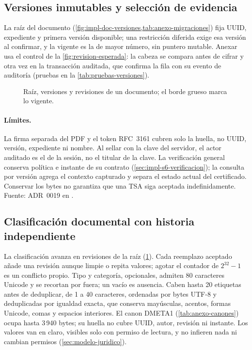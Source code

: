 \subsection{Versiones inmutables y selección de evidencia}\label{sec:impl-http-versiones}

La raíz del documento (\cref{fig:impl-doc-versiones,tab:anexo-migraciones}) fija UUID, expediente y primera versión disponible; una restricción diferida exige esa versión al confirmar, y la vigente es la de mayor número, sin puntero mutable. Anexar usa el control de la \cref{fig:revision-esperada}: la cabeza se compara antes de cifrar y otra vez en la transacción auditada, que confirma la fila con su evento de auditoría (pruebas en la \cref{tab:pruebas-versiones}).

\begin{figure}[!htbp]
  \centering
  
  \caption{Raíz, versiones y revisiones de un documento; el borde grueso marca lo vigente.}
  \label{fig:impl-doc-versiones}
\end{figure}

\paragraph{Límites.} La firma separada del PDF y el token RFC~3161 cubren solo la huella, no UUID, versión, expediente ni nombre. Al sellar con la clave del servidor, el actor auditado es el de la sesión, no el titular de la clave. La verificación general conserva política e instante de su contrato (\cref{sec:impl-s6-verificacion}); la consulta por versión agrega el contexto capturado y separa el estado actual del certificado. Conservar los bytes no garantiza que una TSA siga aceptada indefinidamente. Fuente: ADR~0019 en .

\subsection{Clasificación documental con historia independiente}\label{sec:impl-http-clasificacion}

La clasificación avanza en revisiones de la raíz (\cref{fig:impl-doc-versiones}). Cada reemplazo aceptado añade una revisión aunque limpie o repita valores; agotar el contador de $2^{32}-1$ es un conflicto propio. Tipo y categoría, opcionales, admiten 80 caracteres Unicode y se recortan por fuera; un vacío es ausencia. Caben hasta 20 etiquetas antes de deduplicar, de 1 a 40 caracteres, ordenadas por bytes UTF-8 y deduplicadas por igualdad exacta, que conserva mayúsculas, acentos, formas Unicode, comas y espacios interiores. El canon DMETA1 (\cref{tab:anexo-canones}) ocupa hasta 3\,940 bytes; su huella no cubre UUID, autor, revisión ni instante. Los valores van en claro, visibles solo con permiso de lectura, y no infieren nada ni cambian permisos (\cref{sec:modelo-juridico}).

